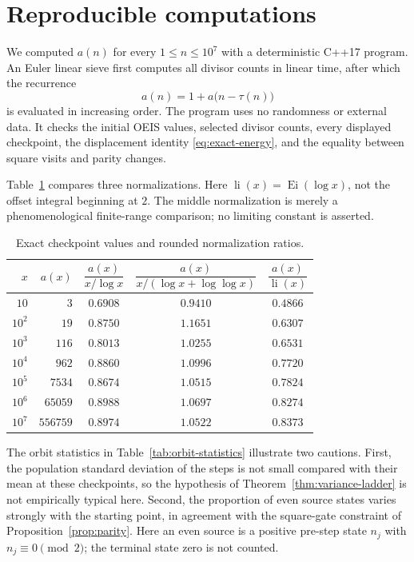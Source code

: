 \documentclass[11pt]{article}
\theoremstyle{definition}
\theoremstyle{remark}
\newcommand{\li}{\operatorname{li}}
\begin{document}
\section{Reproducible computations}\label{sec:numerics}

We computed $a(n)$ for every $1\leq n\leq10^7$ with a deterministic
C++17 program.  An Euler linear sieve first computes all divisor counts
in linear time, after which the recurrence
\[
 a(n)=1+a\bigl(n-\tau(n)\bigr)
\]
is evaluated in increasing order.  The program uses no randomness or
external data.  It checks the initial OEIS values, selected divisor
counts, every displayed checkpoint, the displacement identity
\eqref{eq:exact-energy}, and the equality between square visits and
parity changes.

Table~\ref{tab:normalizations} compares three normalizations.  Here
$\li(x)=\operatorname{Ei}(\log x)$, not the offset integral beginning
at $2$.  The middle normalization is merely a phenomenological
finite-range comparison; no limiting constant is asserted.

\begin{table}[htbp]
\centering
\small
\caption{Exact checkpoint values and rounded normalization ratios.}
\label{tab:normalizations}
\begin{tabular}{@{}r r c c c@{}}
\toprule
$x$ & $a(x)$
& $\dfrac{a(x)}{x/\log x}$
& $\dfrac{a(x)}{x/(\log x+\log\log x)}$
& $\dfrac{a(x)}{\li(x)}$\\
\midrule
$10$       & $3$      & $0.6908$ & $0.9410$ & $0.4866$\\
$10^2$     & $19$     & $0.8750$ & $1.1651$ & $0.6307$\\
$10^3$     & $116$    & $0.8013$ & $1.0255$ & $0.6531$\\
$10^4$     & $962$    & $0.8860$ & $1.0996$ & $0.7720$\\
$10^5$     & $7534$   & $0.8674$ & $1.0515$ & $0.7824$\\
$10^6$     & $65059$  & $0.8988$ & $1.0697$ & $0.8274$\\
$10^7$     & $556759$ & $0.8974$ & $1.0522$ & $0.8373$\\
\bottomrule
\end{tabular}
\end{table}

The orbit statistics in Table~\ref{tab:orbit-statistics} illustrate
two cautions.  First, the population standard deviation of the steps is
not small compared with their mean at these checkpoints, so the
hypothesis of Theorem~\ref{thm:variance-ladder} is not empirically
typical here.  Second, the proportion of even source states varies
strongly with the starting point, in agreement with the square-gate
constraint of Proposition~\ref{prop:parity}.
Here an even source is a positive pre-step state $n_j$ with
$n_j\equiv0\pmod2$; the terminal state zero is not counted.
\end{document}

